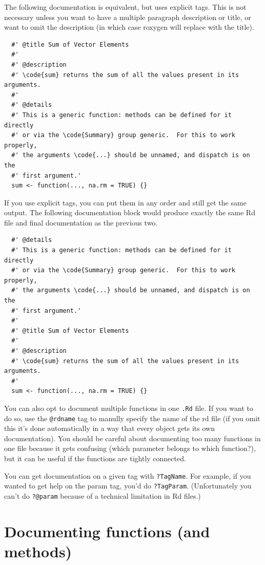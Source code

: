 The following documentation is equivalent, but uses explicit tags. This
is not necessary unless you want to have a multiple paragraph
description or title, or want to omit the description (in which case
roxygen will replace with the title).

\begin{verbatim}
  #' @title Sum of Vector Elements
  #'
  #' @description
  #' \code{sum} returns the sum of all the values present in its arguments.
  #'
  #' @details
  #' This is a generic function: methods can be defined for it directly
  #' or via the \code{Summary} group generic.  For this to work properly,
  #' the arguments \code{...} should be unnamed, and dispatch is on the
  #' first argument.'
  sum <- function(..., na.rm = TRUE) {}
\end{verbatim}

If you use explicit tags, you can put them in any order and still get
the same output. The following documentation block would produce exactly
the same Rd file and final documentation as the previous two.

\begin{verbatim}
  #' @details
  #' This is a generic function: methods can be defined for it directly
  #' or via the \code{Summary} group generic.  For this to work properly,
  #' the arguments \code{...} should be unnamed, and dispatch is on the
  #' first argument.'
  #'
  #' @title Sum of Vector Elements
  #'
  #' @description
  #' \code{sum} returns the sum of all the values present in its arguments.
  #'
  sum <- function(..., na.rm = TRUE) {}
\end{verbatim}

You can also opt to document multiple functions in one \texttt{.Rd}
file. If you want to do so, use the \texttt{@rdname} tag to manully
specify the name of the rd file (if you omit this it's done
automatically in a way that every object gets its own documentation).
You should be careful about documenting too many functions in one file
because it gets confusing (which parameter belongs to which function?),
but it can be useful if the functions are tightly connected.

You can get documentation on a given tag with \texttt{?TagName}. For
example, if you wanted to get help on the param tag, you'd do
\texttt{?TagParam}. (Unfortunately you can't do \texttt{?@param} because
of a technical limitation in Rd files.)

\section{Documenting functions (and methods)}

